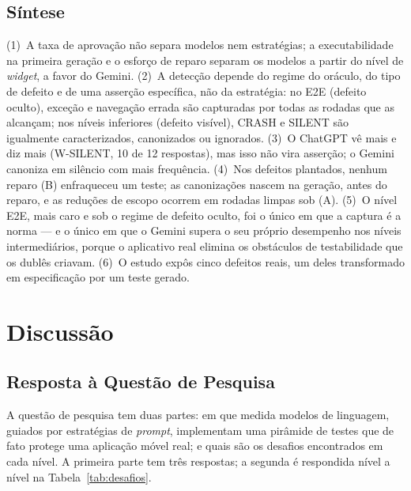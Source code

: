 \documentclass[12pt]{article}
\begin{document}
\subsection{Síntese}
\label{subsec:res-sintese}

(1)~A taxa de aprovação não separa modelos nem estratégias; a
executabilidade na primeira geração e o esforço de reparo separam os
modelos a partir do nível de \textit{widget}, a favor do Gemini.
(2)~A detecção depende do regime do oráculo, do tipo de defeito e de uma
asserção específica, não da estratégia: no E2E (defeito oculto), exceção e
navegação errada são capturadas por todas as rodadas que as alcançam; nos
níveis inferiores (defeito visível), CRASH e SILENT são igualmente
caracterizados, canonizados ou ignorados.
(3)~O ChatGPT vê mais e diz mais (W-SILENT, 10 de 12 respostas), mas isso
não vira asserção; o Gemini canoniza em silêncio com mais frequência.
(4)~Nos defeitos plantados, nenhum reparo (B) enfraqueceu um teste; as
canonizações nascem na geração, antes do reparo, e as reduções de escopo
ocorrem em rodadas limpas sob (A).
(5)~O nível E2E, mais caro e sob o regime de defeito oculto, foi o único em
que a captura é a norma --- e o
único em que o Gemini supera o seu próprio desempenho nos níveis
intermediários, porque o aplicativo real elimina os obstáculos de
testabilidade que os dublês criavam.
(6)~O estudo expôs cinco defeitos reais, um deles transformado em
especificação por um teste gerado.

\section{Discussão}
\label{sec:discussao}

\subsection{Resposta à Questão de Pesquisa}
\label{subsec:disc-qp}

A questão de pesquisa tem duas partes: em que medida modelos de linguagem,
guiados por estratégias de \textit{prompt}, implementam uma pirâmide de testes
que de fato protege uma aplicação móvel real; e quais são os desafios
encontrados em cada nível. A primeira parte tem três respostas; a segunda é
respondida nível a nível na Tabela~\ref{tab:desafios}.
\end{document}
